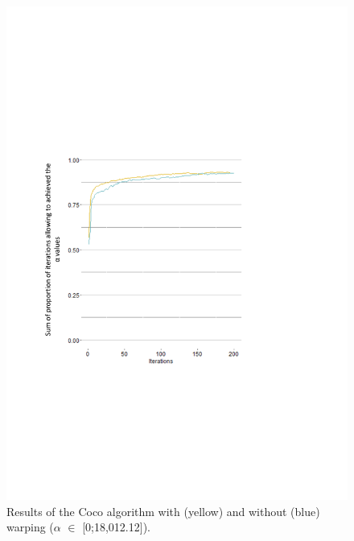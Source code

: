 \begin{figure}[!ht]
	\centering
	\includegraphics[trim = 2cm 7cm 6cm 8cm, clip]{Figures_Warping_resultats_courbes_algoCoco_0_18000.pdf}
	\caption{Results of the Coco algorithm with (yellow) and without (blue) warping ($\alpha$ $\in$ [0;18,012.12]).}\label{fig:algococo0}
\end{figure}

